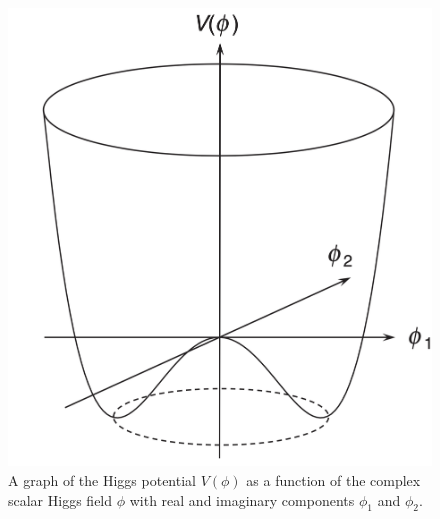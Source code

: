 \begin{figure}[H]
    \centering
    \includegraphics[width=.5\textwidth]{Images/HiggsPotential.png}
    \caption{A graph of the Higgs potential $V(\phi)$ as a function of the complex scalar Higgs field $\phi$ with real and imaginary components $\phi_1$ and $\phi_2$.}
    \label{fig:HiggsPotential}
\end{figure}

